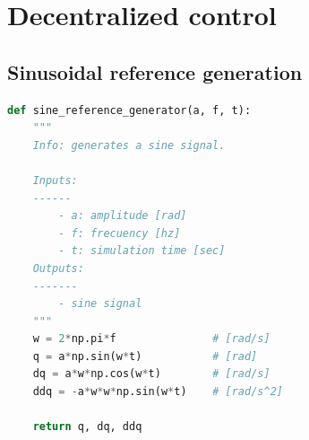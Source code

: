 \documentclass[12pt, a4paper]{article}
\begin{document}
\section{Decentralized control}
\subsection{Sinusoidal reference generation}
\begin{lstlisting}[language=Python,caption=Function to generate sinusoidal reference.]
def sine_reference_generator(a, f, t):
    """
    Info: generates a sine signal.

    Inputs: 
    ------
        - a: amplitude [rad]
        - f: frecuency [hz]
        - t: simulation time [sec]
    Outputs:
    -------
        - sine signal
    """
    w = 2*np.pi*f               # [rad/s]
    q = a*np.sin(w*t)           # [rad]
    dq = a*w*np.cos(w*t)        # [rad/s]
    ddq = -a*w*w*np.sin(w*t)    # [rad/s^2]

    return q, dq, ddq
\end{lstlisting}
\end{document}
